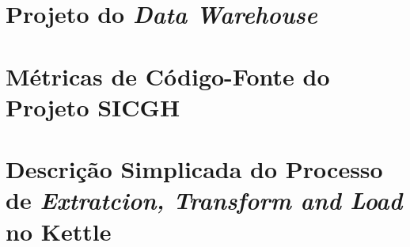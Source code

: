 \begin{apendicesenv}

\chapter{Projeto do \textit{Data Warehouse}}

\label{project-dw}




\chapter{Métricas de Código-Fonte do Projeto SICGH}
\label{metrics-data}



\chapter{Descrição Simplicada do Processo de \textit{Extratcion, Transform and Load} no Kettle}

\label{implementação}


\end{apendicesenv}
